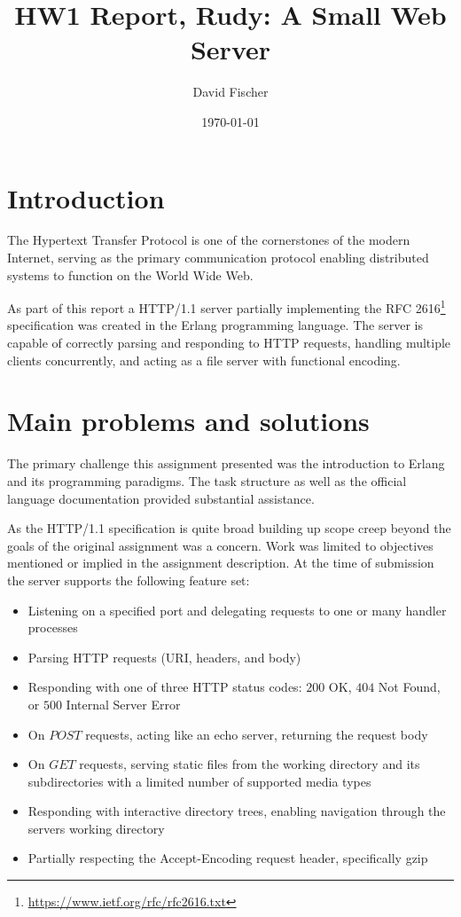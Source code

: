 \documentclass[a4paper, 11pt]{article}
\title{HW1 Report, Rudy: A Small Web Server}
\author{David Fischer}
\date{\today{}}
\begin{document}
\maketitle

\section{Introduction}
The Hypertext Transfer Protocol is one of the cornerstones of the modern Internet, serving as the primary communication protocol enabling distributed systems to function on the World Wide Web.

As part of this report a HTTP/1.1 server partially implementing the RFC 2616\footnote{\url{https://www.ietf.org/rfc/rfc2616.txt}} specification was created in the Erlang programming language.
The server is capable of correctly parsing and responding to HTTP requests, handling multiple clients concurrently, and acting as a file server with functional encoding.
\section{Main problems and solutions}
The primary challenge this assignment presented was the introduction to Erlang and its programming paradigms. The task structure as well as the official language documentation provided substantial assistance.

As the HTTP/1.1 specification is quite broad building up scope creep beyond the goals of the original assignment was a concern. Work was limited to objectives mentioned or implied in the assignment description.
At the time of submission the server supports the following feature set:
\begin{itemize}
\item Listening on a specified port and delegating requests to one or many handler processes 
\item Parsing HTTP requests (URI, headers, and body)
\item Responding with one of three HTTP status codes: $200$ OK, $404$ Not Found, or $500$ Internal Server Error
\item On $POST$ requests, acting like an echo server, returning the request body
\item On $GET$ requests, serving static files from the working directory and its subdirectories with a limited number of supported media types
\item Responding with interactive directory trees, enabling navigation through the servers working directory
\item Partially respecting the Accept-Encoding request header, specifically gzip
\end{itemize}
\end{document}
